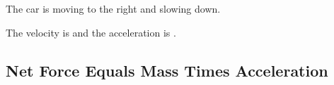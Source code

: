\documentclass[answers]{exam}
\begin{document}
\begin{questions}
\question
The car is moving to the right and slowing down. 

\begin{center}
\end{center}

The velocity is \fillin[positive][4cm] and the acceleration is \fillin[negative][4cm].

\end{questions}

\clearpage



\subsection*{Net Force Equals Mass Times Acceleration}
\end{document}
